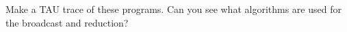   Make a TAU trace of these programs. Can you see what algorithms are
  used for the broadcast and reduction?
